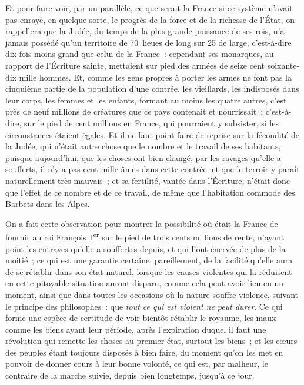 \documentclass[french,twoside]{book} %
\begin{document}
Et pour faire voir, par un parallèle, ce que serait la France si ce système n’avait pas enrayé, en quelque sorte, le progrès de la force et de la richesse de l’État, on rappellera que la Judée, du temps de la plus grande puissance de ses rois, n’a jamais possédé qu’un territoire de 70 lieues de long sur 25 de large, c’est-à-dire dix fois moins grand que celui de la France : cependant ses monarques, au rapport de l’Écriture sainte, mettaient sur pied des armées de seize cent soixante-dix mille hommes. Et, comme les gens propres à porter les armes ne font pas la cinquième partie de la population d’une contrée, les vieillards, les indisposés dans leur corps, les femmes et les enfants, formant au moins les quatre autres, c’est près de neuf millions de créatures que ce pays contenait et nourrissait ; c’est-à-dire, sur le pied de cent millions en France, qui pourraient y subsister, si les circonstances étaient égales. Et il ne faut point faire de reprise sur la fécondité de la Judée, qui n’était autre chose que le nombre et le travail de ses habitants, puisque aujourd’hui, que les choses ont bien changé, par les ravages qu’elle a soufferts, il n’y a pas cent mille âmes dans cette contrée, et que le terroir y paraît naturellement très mauvais ; et sa fertilité, vantée dans l’Écriture, n’était donc que l’effet de ce nombre et de ce travail, de même que l’habitation commode des Barbets dans les Alpes.\par
On a fait cette observation pour montrer la possibilité où était la France de fournir au roi François I\textsuperscript{er} sur le pied de trois cents millions de rente, n’ayant point les entraves qu’elle a souffertes depuis, et qui l’ont énervée de plus de la moitié ; ce qui est une garantie certaine, pareillement, de la facilité qu’elle aura de se rétablir dans son état naturel, lorsque les causes violentes qui la réduisent en cette pitoyable situation auront disparu, comme cela peut avoir lieu en un moment, ainsi que dans toutes les occasions où la nature souffre violence, suivant le principe des philosophes : que {\itshape tout ce qui est violent ne peut durer}. Ce qui forme une espèce de certitude de voir bientôt rétablir le royaume, les maux comme les biens ayant leur période, après l’expiration duquel il faut une révolution qui remette les choses au premier état, surtout les biens ; et les cœurs des peuples étant toujours disposés à bien faire, du moment qu’on les met en pouvoir de donner cours à leur bonne volonté, ce qui est, par malheur, le contraire de la marche suivie, depuis bien longtemps, jusqu’à ce jour.\par
\end{document}
